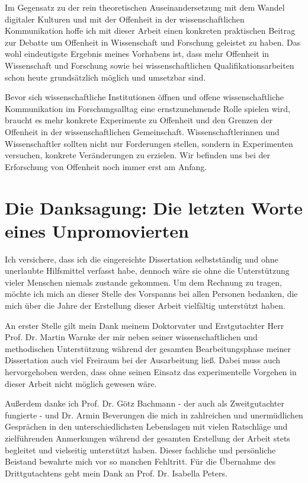 Im Gegensatz zu der rein theoretischen Auseinandersetzung mit dem Wandel digitaler Kulturen und mit der Offenheit in der wissenschaftlichen Kommunikation hoffe ich mit dieser Arbeit einen konkreten praktischen Beitrag zur Debatte um Offenheit in Wissenschaft und Forschung geleistet zu haben. Das wohl eindeutigste Ergebnis meines Vorhabens ist, dass mehr Offenheit in Wissenschaft und Forschung sowie bei wissenschaftlichen Qualifikationsarbeiten schon heute grundsätzlich möglich und umsetzbar sind.

Bevor sich wissenschaftliche Institutionen öffnen und offene wissenschaftliche Kommunikation im Forschungsalltag eine ernstzunehmende Rolle spielen wird, braucht es mehr konkrete Experimente zu Offenheit und den Grenzen der Offenheit in der wissenschaftlichen Gemeinschaft. Wissenschaftlerinnen und Wissenschaftler sollten nicht nur Forderungen stellen, sondern in Experimenten versuchen, konkrete Veränderungen zu erzielen. Wir befinden uns bei der Erforschung von Offenheit noch immer erst am Anfang.

\section{Die Danksagung: Die letzten Worte eines Unpromovierten}

Ich versichere, dass ich die eingereichte Dissertation selbstständig und ohne unerlaubte Hilfsmittel verfasst habe, dennoch wäre sie ohne die Unterstützung vieler Menschen niemals zustande gekommen. Um dem Rechnung zu tragen, möchte ich mich an dieser Stelle des Vorspanns bei allen Personen bedanken, die mich über die Jahre der Erstellung dieser Arbeit vielfältig unterstützt haben.

An erster Stelle gilt mein Dank meinem Doktorvater und Erstgutachter Herr Prof. Dr. Martin Warnke der mir neben seiner wissenschaftlichen und methodischen Unterstützung während der gesamten Bearbeitungsphase meiner Dissertation auch viel Freiraum bei der Ausarbeitung ließ. Dabei muss auch hervorgehoben werden, dass ohne seinen Einsatz das experimentelle Vorgehen in dieser Arbeit nicht möglich gewesen wäre.

Außerdem danke ich Prof. Dr. Götz Bachmann - der auch als Zweitgutachter fungierte - und Dr. Armin Beverungen die mich in zahlreichen und unermüdlichen Gesprächen in den unterschiedlichsten Lebenslagen mit vielen Ratschläge und zielführenden Anmerkungen während der gesamten Erstellung der Arbeit stets begleitet und vielseitig unterstützt haben. Dieser fachliche und persönliche Beistand bewahrte mich vor so manchen Fehltritt. Für die Übernahme des Drittgutachtens geht mein Dank an Prof. Dr. Isabella Peters.


